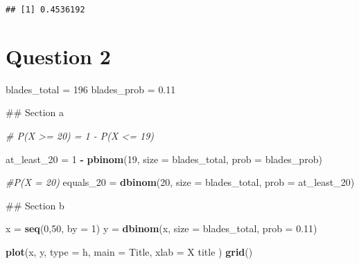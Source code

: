 \documentclass[
]{article}
\newenvironment{Shaded}{\begin{snugshade}}{\end{snugshade}}
\newcommand{\AttributeTok}[1]{\textcolor[rgb]{0.13,0.29,0.53}{#1}}
\newcommand{\CommentTok}[1]{\textcolor[rgb]{0.56,0.35,0.01}{\textit{#1}}}
\newcommand{\DecValTok}[1]{\textcolor[rgb]{0.00,0.00,0.81}{#1}}
\newcommand{\FloatTok}[1]{\textcolor[rgb]{0.00,0.00,0.81}{#1}}
\newcommand{\FunctionTok}[1]{\textcolor[rgb]{0.13,0.29,0.53}{\textbf{#1}}}
\newcommand{\NormalTok}[1]{#1}
\newcommand{\OtherTok}[1]{\textcolor[rgb]{0.56,0.35,0.01}{#1}}
\newcommand{\SpecialCharTok}[1]{\textcolor[rgb]{0.81,0.36,0.00}{\textbf{#1}}}
\newcommand{\StringTok}[1]{\textcolor[rgb]{0.31,0.60,0.02}{#1}}
\begin{document}
\begin{verbatim}
## [1] 0.4536192
\end{verbatim}

\hypertarget{question-2}{%
\section{Question 2}\label{question-2}}

\begin{Shaded}
\begin{Highlighting}[]
\NormalTok{  blades\_total }\OtherTok{=} \DecValTok{196}
\NormalTok{  blades\_prob }\OtherTok{=} \FloatTok{0.11}
\end{Highlighting}
\end{Shaded}

\#\# Section a

\begin{Shaded}
\begin{Highlighting}[]
  \CommentTok{\# P(X \textgreater{}= 20) = 1 {-} P(X \textless{}= 19)}

\NormalTok{  at\_least\_20 }\OtherTok{=} \DecValTok{1} \SpecialCharTok{{-}} \FunctionTok{pbinom}\NormalTok{(}\DecValTok{19}\NormalTok{, }\AttributeTok{size =}\NormalTok{ blades\_total, }\AttributeTok{prob =}\NormalTok{ blades\_prob)}

  \CommentTok{\#P(X = 20)}
\NormalTok{  equals\_20 }\OtherTok{=} \FunctionTok{dbinom}\NormalTok{(}\DecValTok{20}\NormalTok{, }\AttributeTok{size =}\NormalTok{ blades\_total, }\AttributeTok{prob =}\NormalTok{ at\_least\_20)}
\end{Highlighting}
\end{Shaded}

\#\# Section b

\begin{Shaded}
\begin{Highlighting}[]
\NormalTok{x }\OtherTok{=} \FunctionTok{seq}\NormalTok{(}\DecValTok{0}\NormalTok{,}\DecValTok{50}\NormalTok{, }\AttributeTok{by =} \DecValTok{1}\NormalTok{)}
\NormalTok{y }\OtherTok{=} \FunctionTok{dbinom}\NormalTok{(x, }\AttributeTok{size =}\NormalTok{ blades\_total, }\AttributeTok{prob =} \FloatTok{0.11}\NormalTok{)}

\FunctionTok{plot}\NormalTok{(x, y, }\AttributeTok{type =} \StringTok{\textquotesingle{}h\textquotesingle{}}\NormalTok{,}
     \AttributeTok{main =} \StringTok{\textquotesingle{}Title\textquotesingle{}}\NormalTok{,}
     \AttributeTok{xlab =} \StringTok{\textquotesingle{}X title\textquotesingle{}}
\NormalTok{     )}
\FunctionTok{grid}\NormalTok{()}
\end{Highlighting}
\end{Shaded}
\end{document}
